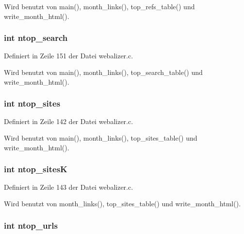 Wird benutzt von main(), month\_\-links(), top\_\-refs\_\-table() und write\_\-month\_\-html().
\subsubsection{\setlength{\rightskip}{0pt plus 5cm}int {\bf ntop\_\-search}}\label{webalizer_8h_57e3ec40e1f85e8b2620950dc43b753f}




Definiert in Zeile 151 der Datei webalizer.c.

Wird benutzt von main(), month\_\-links(), top\_\-search\_\-table() und write\_\-month\_\-html().
\subsubsection{\setlength{\rightskip}{0pt plus 5cm}int {\bf ntop\_\-sites}}\label{webalizer_8h_57531d5f29d4cbdaac1f25e52f4a069d}




Definiert in Zeile 142 der Datei webalizer.c.

Wird benutzt von main(), month\_\-links(), top\_\-sites\_\-table() und write\_\-month\_\-html().
\subsubsection{\setlength{\rightskip}{0pt plus 5cm}int {\bf ntop\_\-sites\-K}}\label{webalizer_8h_a3069c260eedec99be29617d90fa687a}




Definiert in Zeile 143 der Datei webalizer.c.

Wird benutzt von month\_\-links(), top\_\-sites\_\-table() und write\_\-month\_\-html().
\subsubsection{\setlength{\rightskip}{0pt plus 5cm}int {\bf ntop\_\-urls}}\label{webalizer_8h_a450ef7a6e4e6148f9cb184144a7c8cc}




